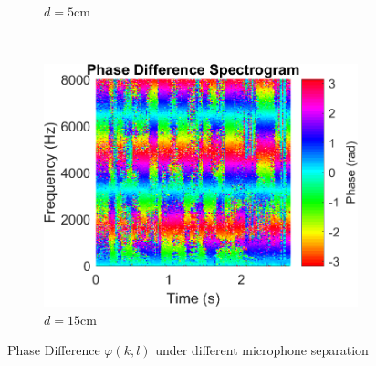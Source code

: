 \documentclass[a4paper,twoside,12pt,hidelinks]{article}
\begin{document}
\begin{figure}[H]
\begin{subfigure}[H]{0.49\textwidth}
\caption{$d=5\text{cm}$}
\end{subfigure}
\\[1em]
\begin{subfigure}[H]{0.49\textwidth}
\includegraphics[width=\textwidth]{phasediffspectd15}
\caption{$d=15\text{cm}$}
\end{subfigure}
\caption{Phase Difference $\varphi(k,l)$ under different microphone separation}
\label{fig:phasediffspec}
\end{figure}
\end{document}
